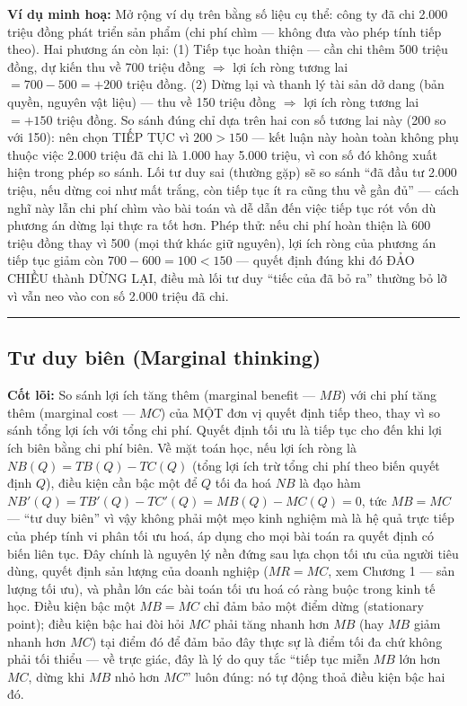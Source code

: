 \documentclass[
]{article}
\begin{document}
\textbf{Ví dụ minh hoạ:} Mở rộng ví dụ trên bằng số liệu cụ thể: công ty
đã chi 2.000 triệu đồng phát triển sản phẩm (chi phí chìm --- không đưa
vào phép tính tiếp theo). Hai phương án còn lại: (1) Tiếp tục hoàn thiện
--- cần chi thêm 500 triệu đồng, dự kiến thu về 700 triệu đồng
\(\Rightarrow\) lợi ích ròng tương lai \(= 700 - 500 = +200\) triệu
đồng. (2) Dừng lại và thanh lý tài sản dở dang (bản quyền, nguyên vật
liệu) --- thu về 150 triệu đồng \(\Rightarrow\) lợi ích ròng tương lai
\(= +150\) triệu đồng. So sánh đúng chỉ dựa trên hai con số tương lai
này (200 so với 150): nên chọn TIẾP TỤC vì \(200 > 150\) --- kết luận
này hoàn toàn không phụ thuộc việc 2.000 triệu đã chi là 1.000 hay 5.000
triệu, vì con số đó không xuất hiện trong phép so sánh. Lối tư duy sai
(thường gặp) sẽ so sánh ``đã đầu tư 2.000 triệu, nếu dừng coi như mất
trắng, còn tiếp tục ít ra cũng thu về gần đủ'' --- cách nghĩ này lẫn chi
phí chìm vào bài toán và dễ dẫn đến việc tiếp tục rót vốn dù phương án
dừng lại thực ra tốt hơn. Phép thử: nếu chi phí hoàn thiện là 600 triệu
đồng thay vì 500 (mọi thứ khác giữ nguyên), lợi ích ròng của phương án
tiếp tục giảm còn \(700 - 600 = 100 < 150\) --- quyết định đúng khi đó
ĐẢO CHIỀU thành DỪNG LẠI, điều mà lối tư duy ``tiếc của đã bỏ ra''
thường bỏ lỡ vì vẫn neo vào con số 2.000 triệu đã chi.

\begin{center}\rule{0.5\linewidth}{0.5pt}\end{center}

\subsection{Tư duy biên (Marginal
thinking)}\label{tux1b0-duy-biuxean-marginal-thinking}

\textbf{Cốt lõi:} So sánh lợi ích tăng thêm (marginal benefit ---
\(MB\)) với chi phí tăng thêm (marginal cost --- \(MC\)) của MỘT đơn vị
quyết định tiếp theo, thay vì so sánh tổng lợi ích với tổng chi phí.
Quyết định tối ưu là tiếp tục cho đến khi lợi ích biên bằng chi phí
biên. Về mặt toán học, nếu lợi ích ròng là \(NB(Q) = TB(Q) - TC(Q)\)
(tổng lợi ích trừ tổng chi phí theo biến quyết định \(Q\)), điều kiện
cần bậc một để \(Q\) tối đa hoá \(NB\) là đạo hàm
\(NB'(Q) = TB'(Q) - TC'(Q) = MB(Q) - MC(Q) = 0\), tức \(MB = MC\) ---
``tư duy biên'' vì vậy không phải một mẹo kinh nghiệm mà là hệ quả trực
tiếp của phép tính vi phân tối ưu hoá, áp dụng cho mọi bài toán ra quyết
định có biến liên tục. Đây chính là nguyên lý nền đứng sau lựa chọn tối
ưu của người tiêu dùng, quyết định sản lượng của doanh nghiệp
(\(MR = MC\), xem Chương 1 --- sản lượng tối ưu), và phần lớn các bài
toán tối ưu hoá có ràng buộc trong kinh tế học. Điều kiện bậc một
\(MB = MC\) chỉ đảm bảo một điểm dừng (stationary point); điều kiện bậc
hai đòi hỏi \(MC\) phải tăng nhanh hơn \(MB\) (hay \(MB\) giảm nhanh hơn
\(MC\)) tại điểm đó để đảm bảo đây thực sự là điểm tối đa chứ không phải
tối thiểu --- về trực giác, đây là lý do quy tắc ``tiếp tục miễn \(MB\)
lớn hơn \(MC\), dừng khi \(MB\) nhỏ hơn \(MC\)'' luôn đúng: nó tự động
thoả điều kiện bậc hai đó.
\end{document}
